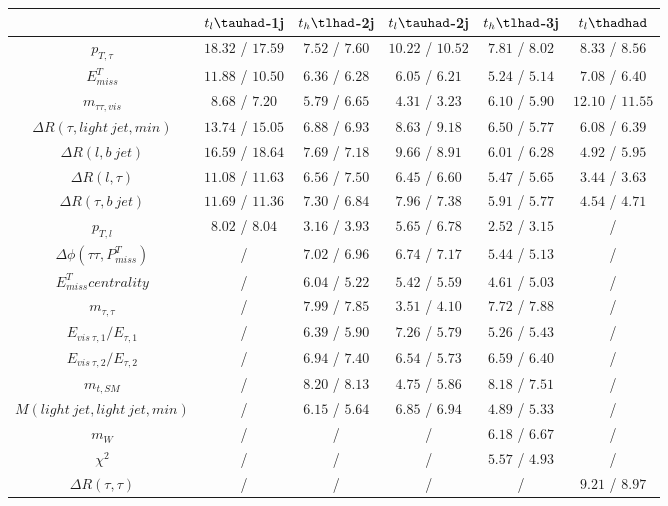 \centering
\begin{tabular}{cccccc} \toprule\toprule
 & $t_{l}\tauhad$-1j & $t_{h}\tlhad$-2j & $t_{l}\tauhad$-2j & $t_{h}\tlhad$-3j & $t_l\thadhad$\\\midrule
$p_{T,\tau }$ & $18.32$ / $17.59$ & $7.52$ / $7.60$ & $10.22$ / $10.52$ & $7.81$ / $8.02$ & $8.33$ / $8.56$\\
$E^{T}_{miss}$ & $11.88$ / $10.50$ & $6.36$ / $6.28$ & $6.05$ / $6.21$ & $5.24$ / $5.14$ & $7.08$ / $6.40$\\
$m_{\tau \tau ,vis}$ & $8.68$ / $7.20$ & $5.79$ / $6.65$ & $4.31$ / $3.23$ & $6.10$ / $5.90$ & $12.10$ / $11.55$\\
$\Delta R(\tau ,light~jet,min)$ & $13.74$ / $15.05$ & $6.88$ / $6.93$ & $8.63$ / $9.18$ & $6.50$ / $5.77$ & $6.08$ / $6.39$\\
$\Delta R(l,b~jet)$ & $16.59$ / $18.64$ & $7.69$ / $7.18$ & $9.66$ / $8.91$ & $6.01$ / $6.28$ & $4.92$ / $5.95$\\
$\Delta R(l,\tau )$ & $11.08$ / $11.63$ & $6.56$ / $7.50$ & $6.45$ / $6.60$ & $5.47$ / $5.65$ & $3.44$ / $3.63$\\
$\Delta R(\tau ,b~jet)$ & $11.69$ / $11.36$ & $7.30$ / $6.84$ & $7.96$ / $7.38$ & $5.91$ / $5.77$ & $4.54$ / $4.71$\\
$p_{T,l}$ & $8.02$ / $8.04$ & $3.16$ / $3.93$ & $5.65$ / $6.78$ & $2.52$ / $3.15$ &  /\\
$\Delta\phi(\tau \tau ,P^{T}_{miss})$ &  / & $7.02$ / $6.96$ & $6.74$ / $7.17$ & $5.44$ / $5.13$ &  /\\
$E^{T}_{miss} centrality$ &  / & $6.04$ / $5.22$ & $5.42$ / $5.59$ & $4.61$ / $5.03$ &  /\\
$m_{\tau ,\tau }$ &  / & $7.99$ / $7.85$ & $3.51$ / $4.10$ & $7.72$ / $7.88$ &  /\\
$E_{vis~\tau ,1}/E_{\tau ,1}$ &  / & $6.39$ / $5.90$ & $7.26$ / $5.79$ & $5.26$ / $5.43$ &  /\\
$E_{vis~\tau ,2}/E_{\tau ,2}$ &  / & $6.94$ / $7.40$ & $6.54$ / $5.73$ & $6.59$ / $6.40$ &  /\\
$m_{t,SM}$ &  / & $8.20$ / $8.13$ & $4.75$ / $5.86$ & $8.18$ / $7.51$ &  /\\
$M(light~jet,light~jet,min)$ &  / & $6.15$ / $5.64$ & $6.85$ / $6.94$ & $4.89$ / $5.33$ &  /\\
$m_{W}$ &  / &  / &  / & $6.18$ / $6.67$ &  /\\
$\chi^{2}$ &  / &  / &  / & $5.57$ / $4.93$ &  /\\
$\Delta R(\tau ,\tau )$ &  / &  / &  / &  / & $9.21$ / $8.97$\\

\end{tabular}
